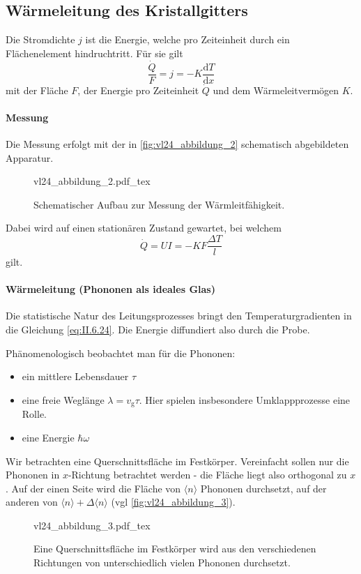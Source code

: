 \subsection{Wärmeleitung des Kristallgitters}
	Die Stromdichte $j$ ist die Energie, welche pro Zeiteinheit durch ein Flächenelement hindruchtritt. Für sie gilt
	\begin{equation}
		\label{eq:II.6.24}
		\frac{\dot{Q}}{F} = j = - K \frac{\mathrm{d}T}{\mathrm{d}x}
	\end{equation}
	mit der Fläche $F$, der Energie pro Zeiteinheit $\dot{Q}$ und dem Wärmeleitvermögen $K$.

\paragraph{Messung}
	Die Messung erfolgt mit der in \autoref{fig:vl24_abbildung_2} schematisch abgebildeten Apparatur.
	\begin{figure}[H]
		\centering
		\def\svgwidth{0.59\columnwidth}
		{vl24_abbildung_2.pdf_tex}
		\caption{Schematischer Aufbau zur Messung der Wärmleitfähigkeit.}
		\label{fig:vl24_abbildung_2}
	\end{figure}

	Dabei wird auf einen stationären Zustand gewartet, bei welchem
	$$
	\dot{Q} = U I = - K F \frac{\Delta T}{l}
	$$ 
	gilt.

\paragraph{Wärmeleitung (Phononen als ideales Glas)}
	Die statistische Natur des Leitungsprozesses bringt den Temperaturgradienten in die Gleichung \eqref{eq:II.6.24}. Die Energie diffundiert also durch die Probe.

	Phänomenologisch beobachtet man für die Phononen:
	\begin{itemize}
		\item ein mittlere Lebensdauer $\tau$
		\item eine freie Weglänge $\lambda = v_{\text{g}} \tau$. Hier spielen insbesondere Umklappprozesse eine Rolle.
		\item eine Energie $\hbar\omega$
	\end{itemize}
	Wir betrachten eine Querschnittsfläche im Festkörper.
	Vereinfacht sollen nur die Phononen in $x$-Richtung betrachtet werden - die Fläche liegt also orthogonal zu $x$.
	Auf der einen Seite wird die Fläche von $\langle n\rangle$ Phononen durchsetzt, auf der anderen von $\langle n\rangle + \Delta\langle n\rangle$ (vgl \autoref{fig:vl24_abbildung_3}).
	\begin{figure}[H]
		\centering
		\def\svgwidth{0.369\columnwidth}
		{vl24_abbildung_3.pdf_tex}
		\caption{Eine Querschnittsfläche im Festkörper wird aus den verschiedenen Richtungen von unterschiedlich vielen Phononen durchsetzt.}
		\label{fig:vl24_abbildung_3}
	\end{figure}

